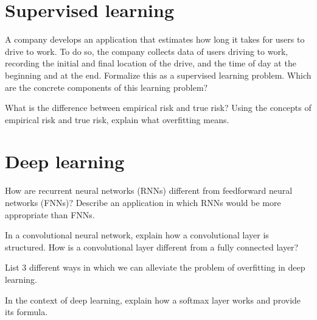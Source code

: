 \documentclass[11pt]{article}
\newcounter{marks}
\begin{document}
\section*{Supervised learning}
\begin{list}{{\bf Question 3.:}}
	{
	}

\item
{}
\addtocounter{marks}{1}
A company develops an application that estimates how long it takes for users to drive to work. To do so, the company collects data of users driving to work, recording the initial and final location of the drive, and the time of day at the beginning and at the end. Formalize this as a supervised learning problem. Which are the concrete components of this learning problem?

\item
{}
\addtocounter{marks}{1}
What is the difference between empirical risk and true risk? Using the concepts of empirical risk and true risk, explain what overfitting means.

\end{list}

\section*{Deep learning}
\begin{list}{{\bf Question 4.:}}
	{
	}

\item
{}
\addtocounter{marks}{1}
How are recurrent neural networks (RNNs) different from feedforward neural networks (FNNs)? Describe an application in which RNNs would be more appropriate than FNNs.

\item
{}
\addtocounter{marks}{1}
In a convolutional neural network, explain how a convolutional layer is structured. How is a convolutional layer different from a fully connected layer?

\item
{}
\addtocounter{marks}{1}
List 3 different ways in which we can alleviate the problem of overfitting in deep learning.

\item
{}
\addtocounter{marks}{1}
In the context of deep learning, explain how a softmax layer works and provide its formula.

\end{list}
\end{document}
